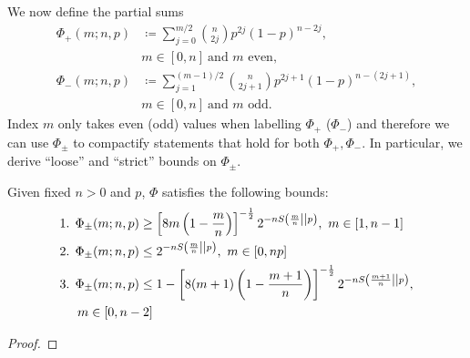 \documentclass[pra,
aps,
twocolumn,
superscriptaddress,
groupedaddress,
nofootinbib,
reprint
]{revtex4-1}
\begin{document}
We now define the partial sums
\begin{align}	
	\Phi_+(m; n, p) &\coloneqq \sum\limits_{j=0}^{m/2} \binom{n}{2j} p^{2j} (1-p)^{n-2j}, \nonumber\\ 
	&m\in[0,n]\ \text{and }m\text{ even}, \label{eq:fp} \\
	\Phi_-(m; n, p) &\coloneqq \sum\limits_{j=1}^{(m-1)/2} \binom{n}{2j+1} p^{2j+1} (1-p)^{n-(2j+1)}, \nonumber\\ 
	&m\in[0,n]\ \text{and }m\text{ odd}. \label{eq:fn2}
\end{align}
Index $m$ only takes even (odd) values when labelling $\Phi_+$ ($\Phi_-$) and therefore we can use $\Phi_{\pm}$ to compactify statements that hold for both $\Phi_+, \Phi_-$.
In particular, we derive ``loose'' and ``strict'' bounds on $\Phi_{\pm}$.
\begin{lemma}\label{lem:bounds_loose}
	Given fixed $n>0$ and $p$, $\Phi$ satisfies the following bounds:
	\begin{align*}
		\begin{split}
		&\text{1. } \Phi_{\pm}(m; n, p) \geq \left[ 8m\left(1-\frac{m}{n}\right) \right]^{-\frac{1}{2}} 2^{-n{S\left( \frac{m}{n} \middle\vert\middle\vert p \right)}},\ m\in [1,n-1] \\
		&\text{2. } \Phi_{\pm}(m; n, p) \leq 2^{-n{S\left( \frac{m}{n} \middle\vert\middle\vert p \right)}},\ m\in [0,np] \\
		&\text{3. } \Phi_{\pm}(m; n, p) \leq 1 - \left[ 8(m+1)\left(1-\frac{m+1}{n}\right) \right]^{-\frac{1}{2}} 2^{-nS\left( \frac{m+1}{n} \middle\vert\middle\vert p \right)}, \\
		&\hspace{14pt} m\in [0,n-2]
		\end{split}
	\end{align*}
\end{lemma}
\begin{proof}
\end{proof}
\end{document}
